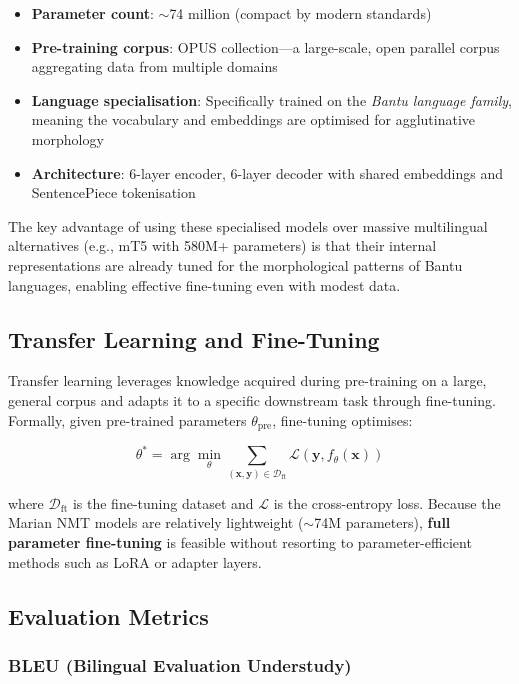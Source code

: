 \documentclass[12pt,a4paper]{article}
\begin{document}
\begin{itemize}
    \item \textbf{Parameter count}: $\sim$74 million (compact by modern standards)
    \item \textbf{Pre-training corpus}: OPUS collection---a large-scale, open parallel corpus aggregating data from multiple domains
    \item \textbf{Language specialisation}: Specifically trained on the \emph{Bantu language family}, meaning the vocabulary and embeddings are optimised for agglutinative morphology
    \item \textbf{Architecture}: 6-layer encoder, 6-layer decoder with shared embeddings and SentencePiece tokenisation
\end{itemize}

The key advantage of using these specialised models over massive multilingual alternatives (e.g., mT5 with 580M+ parameters) is that their internal representations are already tuned for the morphological patterns of Bantu languages, enabling effective fine-tuning even with modest data.

\subsection{Transfer Learning and Fine-Tuning}

Transfer learning leverages knowledge acquired during pre-training on a large, general corpus and adapts it to a specific downstream task through fine-tuning. Formally, given pre-trained parameters \(\theta_{\text{pre}}\), fine-tuning optimises:

\begin{equation}
    \theta^* = \arg\min_\theta \sum_{(\mathbf{x}, \mathbf{y}) \in \mathcal{D}_{\text{ft}}} \mathcal{L}(\mathbf{y}, f_\theta(\mathbf{x}))
\end{equation}

where \(\mathcal{D}_{\text{ft}}\) is the fine-tuning dataset and \(\mathcal{L}\) is the cross-entropy loss. Because the Marian NMT models are relatively lightweight ($\sim$74M parameters), \textbf{full parameter fine-tuning} is feasible without resorting to parameter-efficient methods such as LoRA or adapter layers.

\subsection{Evaluation Metrics}

\subsubsection{BLEU (Bilingual Evaluation Understudy)}
\end{document}
